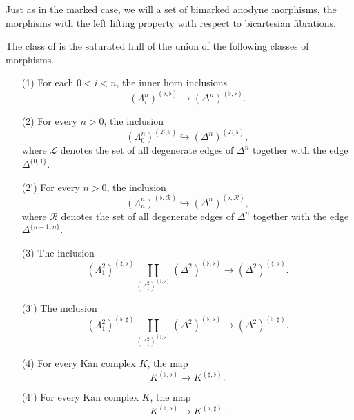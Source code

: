 \documentclass[main.tex]{subfiles}
\begin{document}
Just as in the marked case, we will a set of bimarked anodyne morphisms, the morphisms with the left lifting property with respect to bicartesian fibrations.

\begin{definition}
  The class of  is the saturated hull of the union of the following classes of morphisms.
  \begin{enumerate}
    \item[(1)] For each $0  < i < n$, the inner horn inclusions
      \begin{equation*}
        (\Lambda^{n}_{i})^{(\flat, \flat)} \to (\Delta^{n})^{(\flat, \flat)}.
      \end{equation*}

    \item[(2)] For every $n > 0$, the inclusion
      \begin{equation*}
        (\Lambda^{n}_{0})^{(\mathcal{L}, \flat)} \hookrightarrow (\Delta^{n})^{(\mathcal{L}, \flat)},
      \end{equation*}
      where $\mathcal{L}$ denotes the set of all degenerate edges of $\Delta^{n}$ together with the edge $\Delta^{\{0, 1\}}$.

    \item[(2')] For every $n > 0$, the inclusion
      \begin{equation*}
        (\Lambda^{n}_{n})^{(\flat, \mathcal{R})} \hookrightarrow (\Delta^{n})^{(\flat, \mathcal{R})},
      \end{equation*}
      where $\mathcal{R}$ denotes the set of all degenerate edges of $\Delta^{n}$ together with the edge $\Delta^{\{n-1, n\}}$.

    \item[(3)] The inclusion
      \begin{equation*}
        (\Lambda^{2}_{1})^{(\sharp, \flat)} \coprod_{(\Lambda^{2}_{1})^{(\flat, \flat)}} (\Delta^{2})^{(\flat, \flat)} \to (\Delta^{2})^{(\sharp, \flat)}.
      \end{equation*}

    \item[(3')] The inclusion
      \begin{equation*}
        (\Lambda^{2}_{1})^{(\flat, \sharp)} \coprod_{(\Lambda^{2}_{1})^{(\flat, \flat)}} (\Delta^{2})^{(\flat, \flat)} \to (\Delta^{2})^{(\flat, \sharp)}.
      \end{equation*}

    \item[(4)] For every Kan complex $K$, the map
      \begin{equation*}
        K^{(\flat, \flat)} \to K^{(\sharp, \flat)}.
      \end{equation*}

    \item[(4')] For every Kan complex $K$, the map
      \begin{equation*}
        K^{(\flat, \flat)} \to K^{(\flat, \sharp)}.
      \end{equation*}
  \end{enumerate}
\end{definition}
\end{document}
